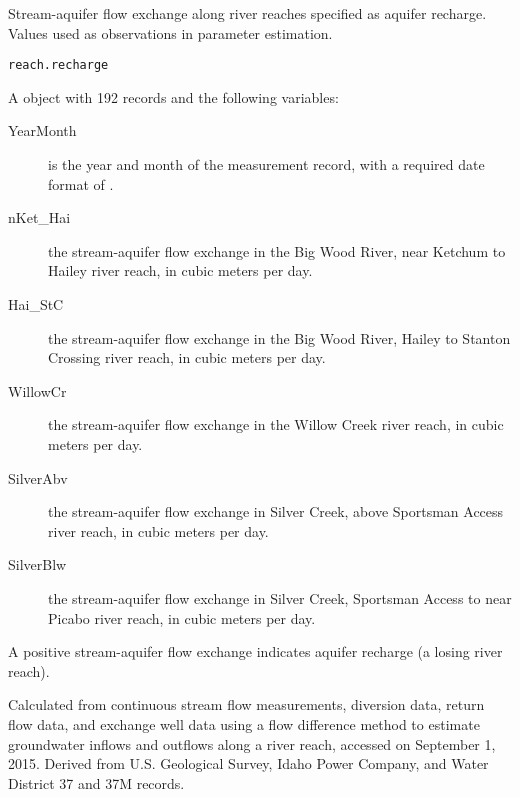 \documentclass[letterpaper]{book}
\begin{document}
%
\begin{Description}\relax
Stream-aquifer flow exchange along river reaches specified as aquifer recharge.
Values used as observations in parameter estimation.
\end{Description}
%
\begin{Usage}
\begin{verbatim}
reach.recharge
\end{verbatim}
\end{Usage}
%
\begin{Format}
A  object with 192 records and the following variables:
\begin{description}

\item[YearMonth] is the year and month of the measurement record, with a required date format of .
\item[nKet\_Hai] the stream-aquifer flow exchange in the Big Wood River, near Ketchum to Hailey river reach, in cubic meters per day.
\item[Hai\_StC] the stream-aquifer flow exchange in the Big Wood River, Hailey to Stanton Crossing river reach, in cubic meters per day.
\item[WillowCr] the stream-aquifer flow exchange in the Willow Creek river reach, in cubic meters per day.
\item[SilverAbv] the stream-aquifer flow exchange in Silver Creek, above Sportsman Access river reach, in cubic meters per day.
\item[SilverBlw] the stream-aquifer flow exchange in Silver Creek, Sportsman Access to near Picabo river reach, in cubic meters per day.

\end{description}

\end{Format}
%
\begin{Details}\relax
A positive stream-aquifer flow exchange indicates aquifer recharge (a losing river reach).
\end{Details}
%
\begin{Source}\relax
Calculated from continuous stream flow measurements, diversion data, return flow data, and exchange well data
using a flow difference method to estimate groundwater inflows and outflows along a river reach, accessed on September 1, 2015.
Derived from U.S. Geological Survey, Idaho Power Company, and Water District 37 and 37M records.
\end{Source}
\end{document}
